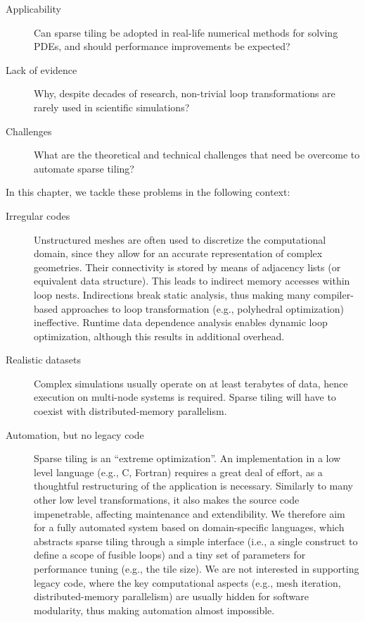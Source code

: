 \begin{description}
\item[Applicability] Can sparse tiling be adopted in real-life numerical methods for solving PDEs, and should performance improvements be expected?
\item[Lack of evidence] Why, despite decades of research, non-trivial loop transformations are rarely used in scientific simulations? 
\item[Challenges] What are the theoretical and technical challenges that need be overcome to automate sparse tiling?
\end{description}

In this chapter, we tackle these problems in the following context:
\begin{description}
\item[Irregular codes] Unstructured meshes are often used to discretize the computational domain, since they allow for an accurate representation of complex geometries. Their connectivity is stored by means of adjacency lists (or equivalent data structure). This leads to indirect memory accesses within loop nests. Indirections break static analysis, thus making many compiler-based approaches to loop transformation (e.g., polyhedral optimization) ineffective. Runtime data dependence analysis enables dynamic loop optimization, although this results in additional overhead.
\item[Realistic datasets] Complex simulations usually operate on at least terabytes of data, hence execution on multi-node systems is required. Sparse tiling will have to coexist with distributed-memory parallelism.
\item[Automation, but no legacy code] Sparse tiling is an ``extreme optimization''. An implementation in a low level language (e.g., C, Fortran) requires a great deal of effort, as a thoughtful restructuring of the application is necessary. Similarly to many other low level transformations, it also makes the source code impenetrable, affecting maintenance and extendibility. We therefore aim for a fully automated system based on domain-specific languages, which abstracts sparse tiling through a simple interface (i.e., a single construct to define a scope of fusible loops) and a tiny set of parameters for performance tuning (e.g., the tile size). We are not interested in supporting legacy code, where the key computational aspects (e.g., mesh iteration, distributed-memory parallelism) are usually hidden for software modularity, thus making automation almost impossible.
\end{description}

